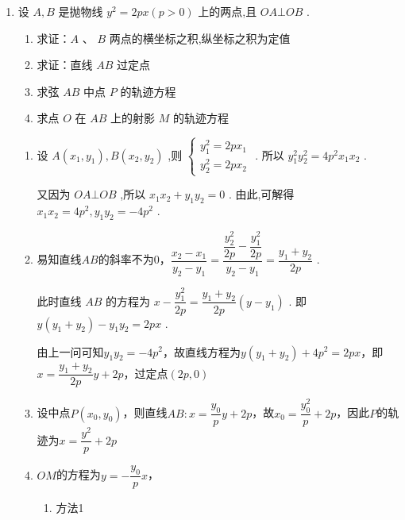 \begin{enumerate}
    \item 设 $A,B$ 是抛物线 ${y}^{2} = {2px}\left( {p > 0}\right)$ 上的两点,且 ${OA} \bot  {OB}$ .
    \begin{enumerate}
        \item 求证：$A$ 、 $B$ 两点的横坐标之积,纵坐标之积为定值
        \item 求证：直线 ${AB}$ 过定点
        \item 求弦 ${AB}$ 中点 $P$ 的轨迹方程
        \item 求点 $O$ 在 ${AB}$ 上的射影 $M$ 的轨迹方程
    \end{enumerate}
    \begin{jieda}
        \begin{enumerate}
            \item 设 $A\left( {{x}_{1},{y}_{1}}\right) ,B\left( {{x}_{2},{y}_{2}}\right)$ ,则 $\left\{\begin{array}{l}
                 {y}_{1}^{2} = {2p}{x}_{1}  \\
                 {y}_{2}^{2} = {2p}{x}_{2}
            \end{array}\right.$ . 所以 ${y}_{1}^{2}{y}_{2}^{2} = 4{p}^{2}{x}_{1}{x}_{2}$ .
            
            又因为 ${OA} \bot  {OB}$ ,所以 ${x}_{1}{x}_{2} + {y}_{1}{y}_{2} = 0$ . 由此,可解得 ${x}_{1}{x}_{2} = 4{p}^{2},{y}_{1}{y}_{2} =  - 4{p}^{2}$ .
            \item 易知直线$AB$的斜率不为0，$\dfrac{{x}_{2} - {x}_{1}}{{y}_{2} - {y}_{1}} = \dfrac{\dfrac{{y}_{2}^{2}}{2p} - \dfrac{{y}_{1}^{2}}{2p}}{{y}_{2} - {y}_{1}} = \dfrac{{y}_{1} + {y}_{2}}{2p}$ .
            
            此时直线 ${AB}$ 的方程为 $x - \dfrac{{y}_{1}^{2}}{2p} = \dfrac{{y}_{1} + {y}_{2}}{2p}\left( y - y_1\right)$ . 即 $y\left( {{y}_{1} + {y}_{2}}\right)  - {y}_{1}{y}_{2} = {2px}$ . 

            由上一问可知${y}_{1}{y}_{2} =  - 4{p}^{2}$，故直线方程为$y\left( {{y}_{1} + {y}_{2}}\right)  +4p^2 = {2px}$，即$x = \dfrac{y_1+y_2}{2p} y + 2p$，过定点$(2p, 0)$
            \item 设中点$P(x_0, y_0)$，则直线$AB: x = \dfrac{y_0}{p} y + 2p$，故$x_0 = \dfrac{y_0^2}{p}+2p$，因此$P$的轨迹为$x = \dfrac{y^2}{p}+2p$
            \item $OM$的方程为$y = -\dfrac{y_0}{p}x$，
            
            \begin{enumerate}
                \item 方法1


\end{enumerate}
\end{enumerate}
\end{jieda}
\end{enumerate}
